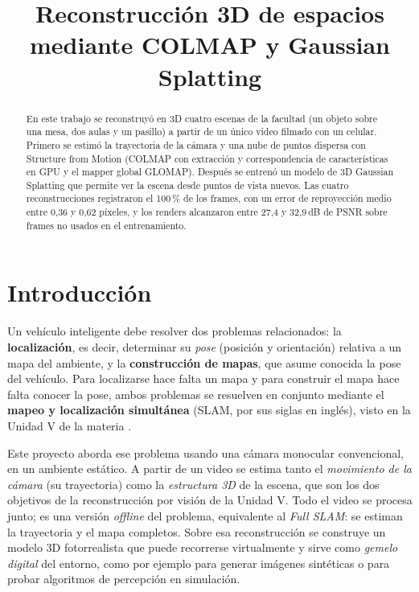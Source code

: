 \documentclass[conference,a4paper]{IEEEtran}
\begin{document}
\title{Reconstrucción 3D de espacios\\mediante COLMAP y Gaussian Splatting}

\author{
}

\maketitle

\begin{abstract}
En este trabajo se reconstruyó en 3D cuatro escenas de la facultad (un objeto sobre una mesa, dos aulas y un pasillo) a partir de un único video filmado con un celular. Primero se estimó la trayectoria de la cámara y una nube de puntos dispersa con Structure from Motion (COLMAP con extracción y correspondencia de características en GPU y el mapper global GLOMAP). Después se entrenó un modelo de 3D Gaussian Splatting que permite ver la escena desde puntos de vista nuevos. Las cuatro reconstrucciones registraron el 100\,\% de los frames, con un error de reproyección medio entre 0,36 y 0,62 píxeles, y los renders alcanzaron entre 27,4 y 32,9\,dB de PSNR sobre frames no usados en el entrenamiento.
\end{abstract}

\section{Introducción}

Un vehículo inteligente debe resolver dos problemas relacionados: la \textbf{localización}, es decir, determinar su \textit{pose} (posición y orientación) relativa a un mapa del ambiente, y la \textbf{construcción de mapas}, que asume conocida la pose del vehículo. Para localizarse hace falta un mapa y para construir el mapa hace falta conocer la pose, ambos problemas se resuelven en conjunto mediante el \textbf{mapeo y localización simultánea} (SLAM, por sus siglas en inglés), visto en la Unidad V de la materia \cite{catedraU5}.

Este proyecto aborda ese problema usando una cámara monocular convencional, en un ambiente estático. A partir de un video se estima tanto el \textit{movimiento de la cámara} (su trayectoria) como la \textit{estructura 3D} de la escena, que son los dos objetivos de la reconstrucción por visión de la Unidad V. Todo el video se procesa junto; es una versión \textit{offline} del problema, equivalente al \textit{Full SLAM}: se estiman la trayectoria y el mapa completos. Sobre esa reconstrucción se construye un modelo 3D fotorrealista que puede recorrerse virtualmente y sirve como \textit{gemelo digital} del entorno, como por ejemplo para generar imágenes sintéticas o para probar algoritmos de percepción en simulación.
\end{document}
